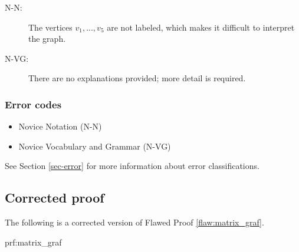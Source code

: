  
 \begin{description}
 	\item[N-N:] The vertices $v_1, ..., v_5$ are not labeled, which makes it difficult to interpret the graph. 
 	\item[N-VG:] There are no explanations provided; more detail is required. 
 \end{description}

 
\subsubsection{Error codes}
\begin{itemize}
	\item 	Novice Notation (N-N)
	\item   Novice Vocabulary and Grammar (N-VG)
\end{itemize}
See Section \ref{sec-error} for more information about error classifications.

\clearpage
\subsection{Corrected proof}

The following is a corrected version of Flawed Proof \ref{flaw:matrix_graf}. %

\begin{prf}{prf:matrix_graf} %
\end{prf}